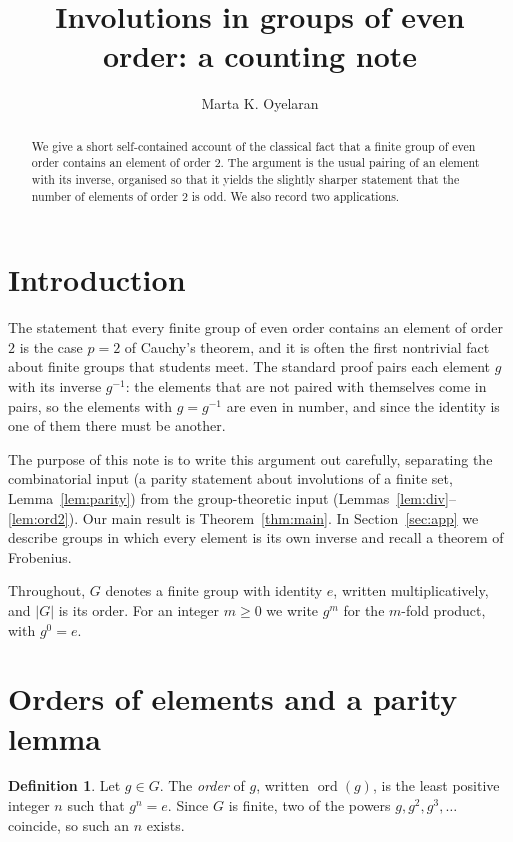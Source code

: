 \documentclass[11pt]{amsart}
\title{Involutions in groups of even order: a counting note}
\author{Marta K. Oyelaran}
\date{}
\theoremstyle{definition}
\newtheorem{definition}[theorem]{Definition}
\theoremstyle{remark}
\DeclareMathOperator{\ord}{ord}
\begin{document}
\begin{abstract}
We give a short self-contained account of the classical fact that a finite group of even
order contains an element of order $2$. The argument is the usual pairing of an element with
its inverse, organised so that it yields the slightly sharper statement that the number of
elements of order $2$ is odd. We also record two applications.
\end{abstract}

\maketitle

\section{Introduction}

The statement that every finite group of even order contains an element of order $2$ is the
case $p=2$ of Cauchy's theorem, and it is often the first nontrivial fact about finite groups
that students meet. The standard proof pairs each element $g$ with its inverse $g^{-1}$: the
elements that are not paired with themselves come in pairs, so the elements with $g=g^{-1}$
are even in number, and since the identity is one of them there must be another.

The purpose of this note is to write this argument out carefully, separating the
combinatorial input (a parity statement about involutions of a finite set,
Lemma~\ref{lem:parity}) from the group-theoretic input (Lemmas~\ref{lem:div}--\ref{lem:ord2}).
Our main result is Theorem~\ref{thm:main}. In Section~\ref{sec:app} we describe groups in which
every element is its own inverse and recall a theorem of Frobenius.

Throughout, $G$ denotes a finite group with identity $e$, written multiplicatively, and $|G|$
is its order. For an integer $m\ge 0$ we write $g^m$ for the $m$-fold product, with $g^0=e$.

\section{Orders of elements and a parity lemma}

\begin{definition}\label{def:ord}
Let $g\in G$. The \emph{order} of $g$, written $\ord(g)$, is the least positive integer $n$
such that $g^n=e$. Since $G$ is finite, two of the powers $g, g^2, g^3,\dots$ coincide, so
such an $n$ exists.
\end{definition}
\end{document}
